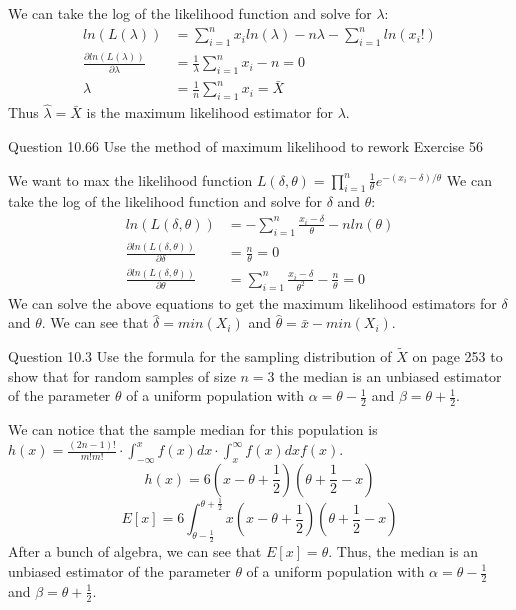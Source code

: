 \documentclass[answers,12pt,addpoints]{exam}
\begin{document}
\begin{questions}
\begin{solution}
        We can take the log of the likelihood function and solve for $\lambda$:
        \begin{align*}
            ln(L(\lambda)) &= \sum_{i=1}^{n} x_i ln(\lambda) - n\lambda - \sum_{i=1}^{n} ln(x_i!) \\
            \frac{\partial ln(L(\lambda))}{\partial \lambda} &= \frac{1}{\lambda} \sum_{i=1}^{n} x_i - n = 0 \\
            \lambda &= \frac{1}{n} \sum_{i=1}^{n} x_i = \bar{X}
        \end{align*}
        Thus $\hat{\lambda} = \bar{X}$ is the maximum likelihood estimator for $\lambda$.
    \end{solution}
    \question Question 10.66
    Use the method of maximum likelihood to rework Exercise 56
    \begin{solution}
        We want to max the likelihood function $L(\delta, \theta) = \prod_{i=1}^{n} \frac{1}{\theta} e^{-(x_i - \delta)/\theta} $ 
        We can take the log of the likelihood function and solve for $\delta$ and $\theta$:
        \begin{align*}
            ln(L(\delta, \theta)) &= -\sum_{i=1}^{n} \frac{x_i - \delta}{\theta} -n ln(\theta) \\
            \frac{\partial ln(L(\delta, \theta))}{\partial \delta} &= \frac{n}{\theta} = 0\\
            \frac{\partial ln(L(\delta, \theta))}{\partial \theta} &=  \sum_{i=1}^{n} \frac{x_i - \delta}{\theta^2} - \frac{n}{\theta} = 0
        \end{align*}
        We can solve the above equations to get the maximum likelihood estimators for $\delta$ and $\theta$.
        We can see that $\hat{\delta} = min(X_i)$ and $\hat{\theta} = \bar{x} - min(X_i)$.
    \end{solution}
    \question Question 10.3
    Use the formula for the sampling distribution of $\tilde{X}$ on page 253 to show that for random
    samples of size $n = 3$ the median is an unbiased estimator of the parameter $\theta$ of a uniform
    population with $\alpha = \theta - \frac{1}{2}$ and $\beta = \theta + \frac{1}{2}$.
    \begin{solution}
        We can notice that the sample median for this population is $h(x) = \frac{(2n -1)!}{m! m!} \cdot \int_{- \infty}^{x} f(x) dx \cdot \int_{x}^{\infty} f(x) dx f(x)$. 
        $$ h(x) = 6 \left( x - \theta +\frac{1}{2}\right)\left(\theta + \frac{1}{2} - x \right)$$
        $$ E[x] =6 \int_{\theta - \frac{1}{2}}^{\theta + \frac{1}{2}} x \left( x - \theta +\frac{1}{2}\right)\left(\theta + \frac{1}{2} - x \right)$$
        After a bunch of algebra, we can see that $E[x] = \theta$. Thus, the median is an unbiased estimator of the parameter $\theta$ of a uniform population with $\alpha = \theta - \frac{1}{2}$ and $\beta = \theta + \frac{1}{2}$.


\end{solution}
\end{questions}
\end{document}

